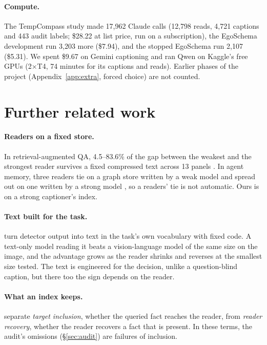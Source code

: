 \documentclass[11pt]{article}
\begin{document}
\paragraph{Compute.} The TempCompass study made 17,962 Claude calls (12,798 reads, 4,721 captions and 443 audit labels; \$28.22 at list price, run on a subscription), the EgoSchema development run 3,203 more (\$7.94), and the stopped EgoSchema run 2,107 (\$5.31). We spent \$9.67 on Gemini captioning and ran Qwen on Kaggle's free GPUs (2×T4, 74 minutes for its captions and reads). Earlier phases of the project (Appendix~\ref{app:extra}, forced choice) are not counted.

\section{Further related work}
\label{app:related}

\paragraph{Readers on a fixed store.} In retrieval-augmented QA, 4.5--83.6\% of the gap between the weakest and the strongest reader survives a fixed compressed text across 13 panels \citep{compressneutral}. In agent memory, three readers tie on a graph store written by a weak model and spread out on one written by a strong model \citep{memorytax}, so a readers' tie is not automatic. Ours is on a strong captioner's index.

\paragraph{Text built for the task.} \citet{semserial} turn detector output into text in the task's own vocabulary with fixed code. A text-only model reading it beats a vision-language model of the same size on the image, and the advantage grows as the reader shrinks and reverses at the smallest size tested. The text is engineered for the decision, unlike a question-blind caption, but there too the sign depends on the reader.

\paragraph{What an index keeps.} \citet{inclusion} separate \emph{target inclusion}, whether the queried fact reaches the reader, from \emph{reader recovery}, whether the reader recovers a fact that is present. In these terms, the audit's omissions (\S\ref{sec:audit}) are failures of inclusion.
\end{document}
